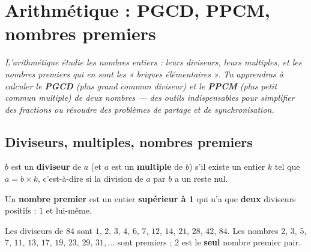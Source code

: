 \chapter{Arithmétique : PGCD, PPCM, nombres premiers}

\noindent\textit{L'arithmétique étudie les nombres entiers : leurs diviseurs, leurs
multiples, et les nombres premiers qui en sont les « briques élémentaires ». Tu apprendras à
calculer le \textbf{PGCD} (plus grand commun diviseur) et le \textbf{PPCM} (plus petit commun
multiple) de deux nombres — des outils indispensables pour simplifier des fractions ou
résoudre des problèmes de partage et de synchronisation.}
\vspace{8pt}

\connecteBanner

\section{Diviseurs, multiples, nombres premiers}

\begin{definition}
$b$ est un \textbf{diviseur} de $a$ (et $a$ est un \textbf{multiple} de $b$) s'il existe un
entier $k$ tel que $a=b\times k$, c'est-à-dire si la division de $a$ par $b$ a un reste nul.
\end{definition}

\begin{definition}
Un \textbf{nombre premier} est un entier \textbf{supérieur à 1} qui n'a que \textbf{deux}
diviseurs positifs : $1$ et lui-même.
\end{definition}

\begin{exemple}
Les diviseurs de $84$ sont $1$, $2$, $3$, $4$, $6$, $7$, $12$, $14$, $21$, $28$, $42$,
$84$. \quad Les nombres $2$, $3$, $5$, $7$, $11$, $13$, $17$, $19$, $23$, $29$, $31,\ldots$
sont premiers ; $2$ est le \textbf{seul} nombre premier pair.
\end{exemple}

